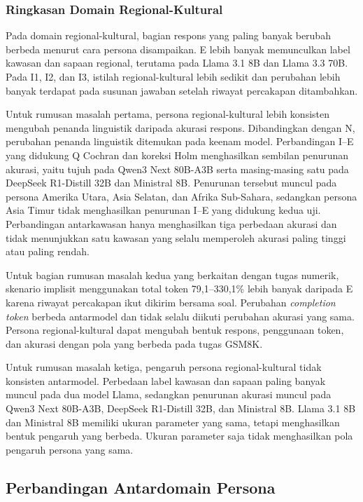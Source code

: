 \subsubsection{Ringkasan Domain Regional-Kultural}
\label{subsubsec:ringkasan-regional-gsm8k}

Pada domain regional-kultural, bagian respons yang paling banyak berubah
berbeda menurut cara persona disampaikan. E lebih banyak memunculkan label
kawasan dan sapaan regional, terutama pada Llama 3.1 8B dan Llama 3.3 70B. Pada
I1, I2, dan I3, istilah regional-kultural lebih sedikit dan perubahan lebih
banyak terdapat pada susunan jawaban setelah riwayat percakapan ditambahkan.

Untuk rumusan masalah pertama, persona regional-kultural lebih konsisten
mengubah penanda linguistik daripada akurasi respons. Dibandingkan dengan N,
perubahan penanda linguistik ditemukan pada keenam model. Perbandingan I--E
yang didukung Q Cochran dan koreksi Holm menghasilkan sembilan penurunan
akurasi, yaitu tujuh pada Qwen3 Next 80B-A3B serta masing-masing satu pada
DeepSeek R1-Distill 32B dan Ministral 8B. Penurunan tersebut muncul pada persona
Amerika Utara, Asia Selatan, dan Afrika Sub-Sahara, sedangkan persona Asia Timur
tidak menghasilkan penurunan I--E yang didukung kedua uji. Perbandingan
antarkawasan hanya menghasilkan tiga perbedaan akurasi dan tidak menunjukkan
satu kawasan yang selalu memperoleh akurasi paling tinggi atau paling rendah.

Untuk bagian rumusan masalah kedua yang berkaitan dengan tugas numerik,
skenario implisit menggunakan total token 79,1--330,1\% lebih banyak daripada E
karena riwayat percakapan ikut dikirim bersama soal. Perubahan \textit{completion
token} berbeda antarmodel dan tidak selalu diikuti perubahan akurasi yang sama.
Persona regional-kultural dapat mengubah bentuk respons, penggunaan
token, dan akurasi dengan pola yang berbeda pada tugas GSM8K.

Untuk rumusan masalah ketiga, pengaruh persona regional-kultural tidak
konsisten antarmodel. Perbedaan label kawasan dan sapaan paling banyak muncul
pada dua model Llama, sedangkan penurunan akurasi muncul pada Qwen3 Next
80B-A3B, DeepSeek R1-Distill 32B, dan Ministral 8B. Llama 3.1 8B dan Ministral
8B memiliki ukuran parameter yang sama, tetapi menghasilkan bentuk pengaruh
yang berbeda. Ukuran parameter saja tidak menghasilkan pola pengaruh persona
yang sama.

\subsection{Perbandingan Antardomain Persona}
\label{subsec:perbandingan-domain-gsm8k}

